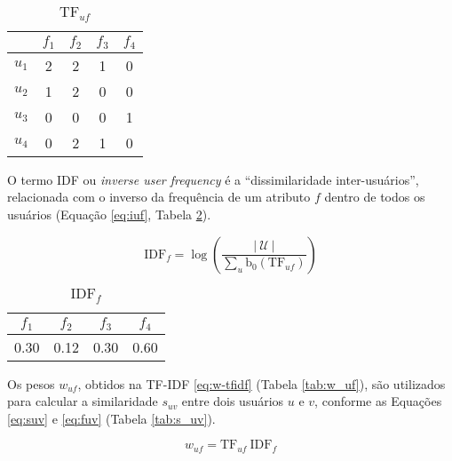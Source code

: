 \begin{table}[p]
\begin{center}
    \caption{$\mathrm{TF}_{uf}$}
    \label{tab:tf_uf}
    \begin{tabular}{ | c | c | c | c | c | } 
    \hline
     & $f_1$ & $f_2$ & $f_3$ & $f_4$   \\ \hline
     $u_1$ & 2 & 2 & 1 & 0  \\ \hline
     $u_2$ & 1 & 2 & 0 & 0  \\ \hline
     $u_3$ & 0 & 0 & 0 & 1  \\ \hline
     $u_4$ & 0 & 2 & 1 & 0  \\ \hline
    \end{tabular}
\end{center}
\end{table}

O termo IDF ou \textit{inverse user frequency} é a ``dissimilaridade inter-usuários'', relacionada com o inverso da frequência de um atributo $f$ dentro de todos os usuários (Equação \ref{eq:iuf}, Tabela \ref{tab:idf_f}).

\begin{equation}
\label{eq:iuf} 
    \mathrm{IDF}_{f} = \log \left( \frac{\left|~\mathcal{U}~\right|}{\sum_{u}{\mathrm{b}_0\left(\mathrm{TF}_{uf}\right)}} \right)
\end{equation} 

\begin{table}[p]
\begin{center}
    \caption{$\mathrm{IDF}_{f}$}
    \label{tab:idf_f}
    \begin{tabular}{ | c | c | c | c | } 
    \hline
     $f_1$ & $f_2$ & $f_3$ & $f_4$   \\ \hline
     0.30 & 0.12 & 0.30 & 0.60  \\ \hline
     \end{tabular}
\end{center}
\end{table}

Os pesos $w_{uf}$, obtidos na TF-IDF \ref{eq:w-tfidf} (Tabela \ref{tab:w_uf}), são utilizados para calcular a similaridade $s_{uv}$ entre dois usuários $u$ e $v$, conforme as Equações \ref{eq:suv} e \ref{eq:fuv} (Tabela \ref{tab:s_uv}).

\begin{equation}
\label{eq:w-tfidf} 
    w_{uf} = \mathrm{TF}_{uf}~\mathrm{IDF}_{f}
\end{equation} 

